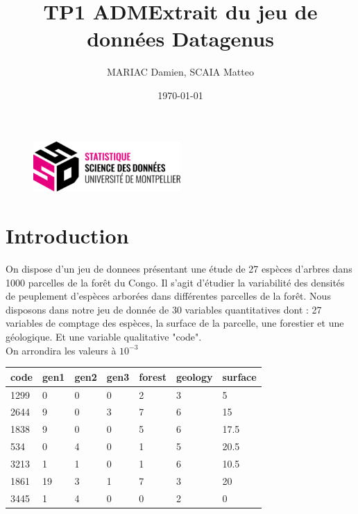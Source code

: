 \documentclass{article}
\title{TP1 ADM}
\author{MARIAC Damien, SCAIA Matteo}
\date{\today}
\begin{document}
\maketitle

\begin{figure}[h] 
    \centering
    \includegraphics[width=0.5\textwidth]{ssd_logo.png} 
\end{figure}

\newpage
\tableofcontents
\newpage

\section{Introduction}
On dispose d'un jeu de donnees présentant une étude de 27 espèces d'arbres dans 1000 parcelles de la forêt du Congo.
Il s'agit d'étudier la variabilité des densités de peuplement d'espèces arborées dans différentes parcelles de la forêt.
Nous disposons dans notre jeu de donnée de 30 variables quantitatives dont : 27 variables de comptage des espèces, la surface de la parcelle, une forestier et une géologique.
Et une variable qualitative "code".
\\
On arrondira les valeurs à $10^{-3}$

\begin{table}[H]
    \centering
    \title{Extrait du jeu de données Datagenus}
    \begin{tabular}{|l|l|l|l|l|l|l|}
    \hline
    code & gen1 & gen2 & gen3 & forest & geology & surface \\ \hline
    1299 & 0    & 0    & 0    & 2      & 3       & 5       \\ \hline
    2644 & 9    & 0    & 3    & 7      & 6       & 15      \\ \hline
    1838 & 9    & 0    & 0    & 5      & 6       & 17.5    \\ \hline
    534  & 0    & 4    & 0    & 1      & 5       & 20.5    \\ \hline
    3213 & 1    & 1    & 0    & 1      & 6       & 10.5    \\ \hline
    1861 & 19   & 3    & 1    & 7      & 3       & 20      \\ \hline
    3445 & 1    & 4    & 0    & 0      & 2       & 0       \\ \hline
    \end{tabular}
\end{table}
\end{document}
